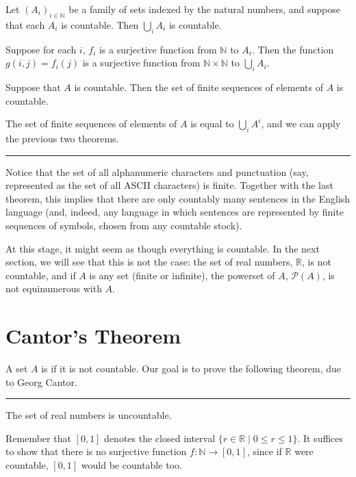 \documentclass[letterpaper,10pt,english]{sphinxmanual}
\begin{document}
\sphinxAtStartPar
{} Let \((A_i)_{i \in \mathbb{N}}\) be a family of sets indexed by the natural numbers, and suppose that each \(A_i\) is countable. Then \(\bigcup_i A_i\) is countable.

\sphinxAtStartPar
{} Suppose for each \(i\), \(f_i\) is a surjective function from \(\mathbb{N}\) to \(A_i\). Then the function \(g(i, j) = f_i(j)\) is a surjective function from \(\mathbb{N} \times \mathbb{N}\) to \(\bigcup_i A_i\).

\sphinxAtStartPar
{} Suppose that \(A\) is countable. Then the set of finite sequences of elements of \(A\) is countable.

\sphinxAtStartPar
{} The set of finite sequences of elements of \(A\) is equal to \(\bigcup_i A^i\), and we can apply the previous two theorems.


\bigskip\hrule\bigskip


\sphinxAtStartPar
Notice that the set of all alphanumeric characters and punctuation (say, represented as the set of all ASCII characters) is finite. Together with the last theorem, this implies that there are only countably many sentences in the English language (and, indeed, any language in which sentences are represented by finite sequences of symbols, chosen from any countable stock).

\sphinxAtStartPar
At this stage, it might seem as though everything is countable. In the next section, we will see that this is not the case: the set of real numbers, \(\mathbb{R}\), is not countable, and if \(A\) is any set (finite or infinite), the powerset of \(A\), \({\mathcal P}(A)\), is not equinumerous with \(A\).


\section{Cantor’s Theorem}
\label{\detokenize{the_infinite:cantor-s-theorem}}
\sphinxAtStartPar
A set \(A\) is  if it is not countable. Our goal is to prove the following theorem, due to Georg Cantor.


\bigskip\hrule\bigskip


\sphinxAtStartPar
{} The set of real numbers is uncountable.

\sphinxAtStartPar
{} Remember that \([0,1]\) denotes the closed interval \(\{ r \in \mathbb{R} \mid 0 \leq r \leq 1\}\). It suffices to show that there is no surjective function \(f : \mathbb{N} \to [0,1]\), since if \(\mathbb{R}\) were countable, \([0,1]\) would be countable too.
\end{document}
